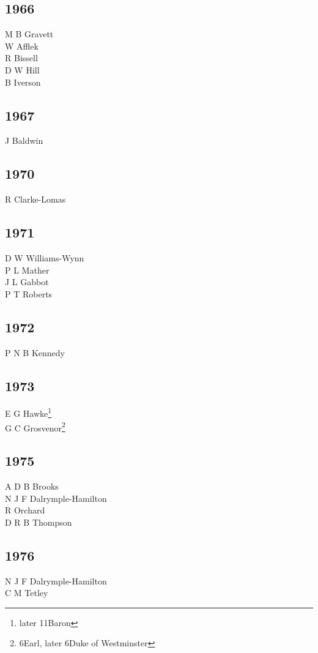 \begin{multicols}{3}
  \subsection*{1966}
  M B Gravett \\
  W Afflek \\
  R Bissell \\
  D W Hill \\
  B Iverson \\
  \subsection*{1967}
  J Baldwin \\
  \subsection*{1970}
  R Clarke-Lomas \\
  \subsection*{1971}
  D W Williams-Wynn \\
  P L Mather \\
  J L Gabbot \\
  P T Roberts \\
  \subsection*{1972}
  P N B Kennedy \\
  \subsection*{1973}
  E G Hawke\footnote{later 11\nth Baron} \\
  G C Grosvenor\footnote{6\nth Earl, later 6\nth Duke of Westminster} \\
  \subsection*{1975}
  A D B Brooks \\
  N J F Dalrymple-Hamilton \\
  R Orchard \\
  D R B Thompson \\
  \subsection*{1976}
  N J F Dalrymple-Hamilton \\
  C M Tetley \\

\end{multicols}
